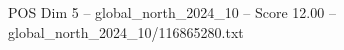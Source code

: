 \begin{textsample}{POS Dim 5 – global\_north\_2024\_10 – Score 12.00 – global\_north\_2024\_10/116865280.txt}
\end{textsample}
